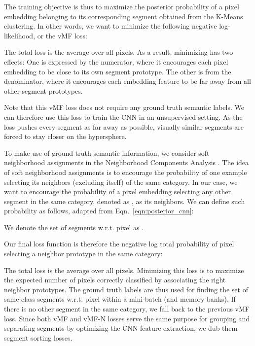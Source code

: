 \documentclass[10pt,twocolumn,letterpaper]{article}
\begin{document}
The training objective is thus to maximize the posterior probability of a pixel embedding belonging to its corresponding segment  obtained from the K-Means clustering.
In other words, we want to minimize the following negative log-likelihood, or the vMF loss:

The total loss is the average over all pixels.
As a result, minimizing  has two effects:
One is expressed by the numerator, where it encourages each pixel embedding to be close to its own segment prototype.
The other is from the denominator, where it encourages each embedding feature to be far away from all other segment prototypes. 


Note that this vMF loss does not require any ground truth semantic labels.
We can therefore use this loss to train the CNN in an unsupervised setting.
As the loss pushes every segment as far away as possible, visually similar segments are forced to stay closer on the hypersphere.


To make use of ground truth semantic information, we consider soft neighborhood assignments in the Neighborhood Components Analysis \cite{goldberger2005neighbourhood}.
The idea of soft neighborhood assignments is to encourage the probability of one example selecting its neighbors (excluding itself) of the same category.
In our case, we want to encourage the probability of a pixel embedding  selecting any other segment in the same category, denoted as  , as its neighbors.
We can define such probability as follows, adapted from Eqn.~\ref{eqn:posterior_cnn}:

We denote the set of segments  w.r.t. pixel  as .


Our final loss function is therefore the negative log total probability of pixel  selecting a neighbor prototype in the same category:

The total loss is the average over all pixels.
Minimizing this loss is to maximize the expected number of pixels correctly classified by associating the right neighbor prototypes.
The ground truth labels are thus used for finding the set of same-class segments  w.r.t. pixel  within a mini-batch (and memory banks).
If there is no other segment in the same category, we fall back to the previous vMF loss.
Since both vMF and vMF-N losses serve the same purpose for grouping and separating segments by optimizing the CNN feature extraction, we dub them segment sorting losses.
\end{document}
